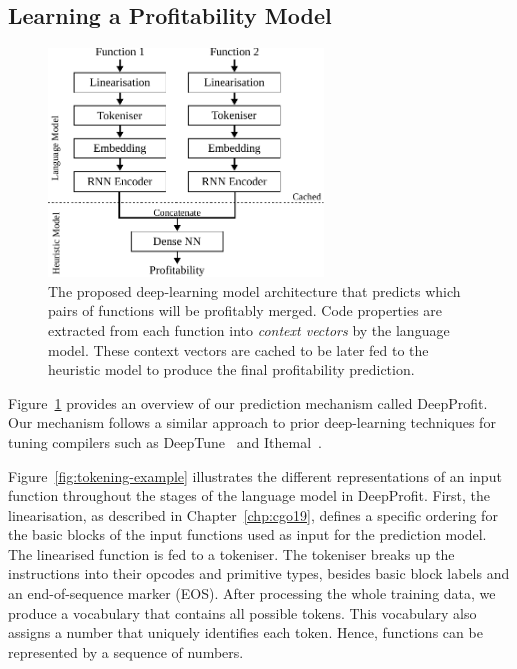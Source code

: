 \subsection{Learning a Profitability Model} \label{sec:deepprofit-model}

\begin{figure}[h]
  \centering
  \includegraphics[width=0.65\textwidth]{src/deeplearning/figs/deeplearning-architecture.pdf}
  \caption{
      The proposed deep-learning model architecture that predicts which pairs of functions will be profitably merged. Code properties are extracted from each function into \textit{context vectors} by the language model.
      These context vectors are cached to be later fed to the heuristic model to produce the final profitability prediction.}
  \label{fig:heuristic-model-architecture}
\end{figure}

Figure~\ref{fig:heuristic-model-architecture} provides an overview of our prediction mechanism called DeepProfit.
Our mechanism follows a similar approach to prior deep-learning techniques for tuning compilers such as DeepTune~\cite{cummins17} and Ithemal~\cite{mendis19}.

Figure~\ref{fig:tokening-example} illustrates the different representations of an input function throughout the stages of the language model in DeepProfit.
First, the linearisation, as described in Chapter~\ref{chp:cgo19}, defines a specific ordering for the basic blocks of the input functions used as input for the prediction model.
The linearised function is fed to a tokeniser.
The tokeniser breaks up the instructions into their opcodes and primitive types, besides basic block labels and an end-of-sequence marker (EOS).
After processing the whole training data, we produce a vocabulary that contains all possible tokens.
This vocabulary also assigns a number that uniquely identifies each token.
Hence, functions can be represented by a sequence of numbers.

